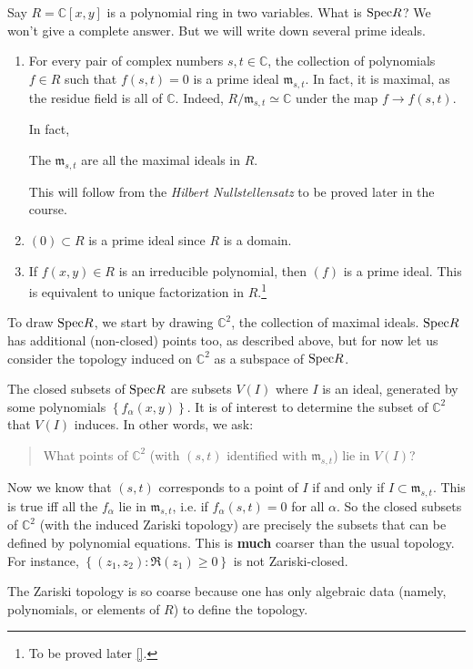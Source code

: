 \begin{example} \label{twovarpoly}
Say $R = \mathbb{C}[x,y]$ is a polynomial ring in two variables.  What is
$\mathrm{Spec} R$? We won't give a complete answer. But we will write down several
prime ideals.

\begin{enumerate}
\item For every pair of complex numbers $s,t \in \mathbb{C}$, the collection of polynomials
$f \in R$ such that $f(s,t) = 0$ is a prime ideal $\mathfrak{m} _{s,t}$.  In
fact, it is maximal, as the residue field is all of $\mathbb{C}$.  Indeed,
$R/\mathfrak{m}_{s,t} \simeq \mathbb{C}$ under the map $f \to f(s,t)$.  

In fact, 
\begin{theorem}
The $\mathfrak{m}_{s,t}$ are all the maximal ideals in $R$.
\end{theorem} 
This will follow from the \emph{Hilbert Nullstellensatz} to be proved later in the course.
\item $(0) \subset R$ is a prime ideal since $R$ is a domain. 
\item  If $f(x,y) \in R$ is an irreducible polynomial, then $(f)$ is a prime
ideal.  This is equivalent to unique factorization in $R$.\footnote{To be
proved later \ref{}.}  
\end{enumerate}

To draw $\mathrm{Spec} R$, we start by drawing $\mathbb{C}^2$, the collection of
maximal ideals.  $\mathrm{Spec} R$ has additional (non-closed) points too, as
described above, but for now let us
consider the topology induced on $\mathbb{C}^2$ as a subspace of $\mathrm{Spec} R$. 

The closed subsets of $\mathrm{Spec} R$ are subsets $V(I)$ where $I$ is an ideal,
generated by some polynomials $\left\{f_{\alpha}(x,y)\right\}$.  
It is of interest to determine  the  subset of $\mathbb{C}^2$ that $V(I)$
induces. In other words, we ask:
\begin{quote}
What points of $\mathbb{C}^2$ (with $(s,t)$ identified with
$\mathfrak{m}_{s,t}$) lie in $V(I)$?
\end{quote}
Now we know that $(s,t)$ corresponds to a point of $I$ if and only if  $I
\subset \mathfrak{m}_{s,t}$.
This is true iff all the
$f_{\alpha} $ lie in $ \mathfrak{m}_{s,t}$, i.e. if $f_{\alpha}(s,t) =0$ for all
$\alpha$.  So the closed subsets of $\mathbb{C}^2$ (with the induced Zariski
topology) are precisely the subsets
that can be defined by polynomial equations.  This is \textbf{much} coarser
than the usual topology.  For instance, $\left\{(z_1,z_2): \Re(z_1) \geq 0\right\}$ is
not Zariski-closed. 

The Zariski topology is so coarse because one has only algebraic data (namely,
polynomials, or elements of $R$) to define the topology.
\end{example} 

